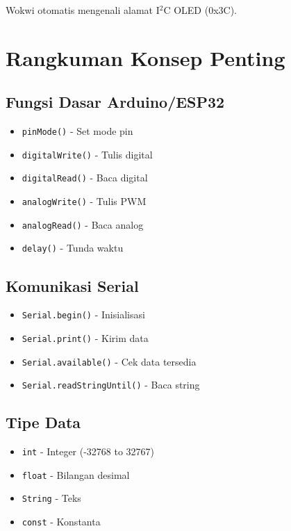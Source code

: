 \documentclass[12pt,a4paper]{article}
\begin{document}
\begin{tcolorbox}[colback=red!5!white,colframe=red!75!black,title=Catatan Penting]
Wokwi otomatis mengenali alamat I$^2$C OLED (0x3C).
\end{tcolorbox}

\newpage
\section{Rangkuman Konsep Penting}

\subsection{Fungsi Dasar Arduino/ESP32}
\begin{itemize}
    \item \texttt{pinMode()} - Set mode pin
    \item \texttt{digitalWrite()} - Tulis digital
    \item \texttt{digitalRead()} - Baca digital
    \item \texttt{analogWrite()} - Tulis PWM
    \item \texttt{analogRead()} - Baca analog
    \item \texttt{delay()} - Tunda waktu
\end{itemize}

\subsection{Komunikasi Serial}
\begin{itemize}
    \item \texttt{Serial.begin()} - Inisialisasi
    \item \texttt{Serial.print()} - Kirim data
    \item \texttt{Serial.available()} - Cek data tersedia
    \item \texttt{Serial.readStringUntil()} - Baca string
\end{itemize}

\subsection{Tipe Data}
\begin{itemize}
    \item \texttt{int} - Integer (-32768 to 32767)
    \item \texttt{float} - Bilangan desimal
    \item \texttt{String} - Teks
    \item \texttt{const} - Konstanta
\end{itemize}
\end{document}
